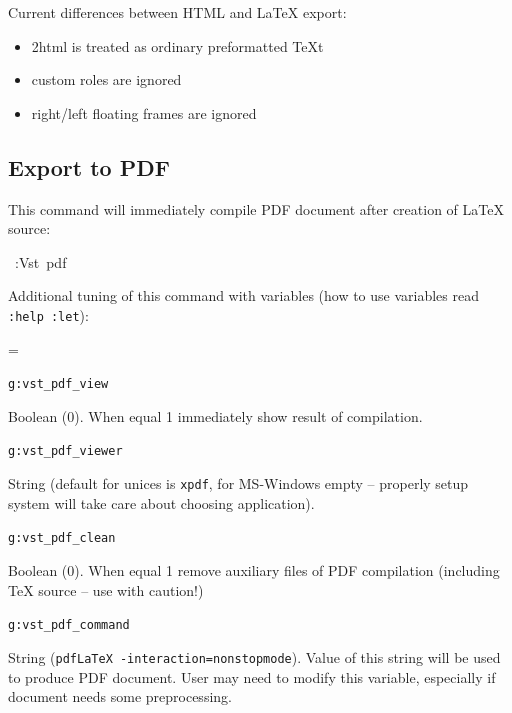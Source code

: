 \documentclass[12pt]{article}
\newenvironment{deflist}[1]{%
\begin{list}{}
{\renewcommand{\makelabel}[1]{\textbf{##1}\hfill}
\settowidth{\labelwidth}{\textbf{#1}}
\leftmargin=\labelwidth
\advance \leftmargin\labelsep}}
{\end{list}}
\begin{document}
Current differences between HTML and \LaTeX{} export:

\begin{itemize}
\item
2html is treated as ordinary preformatted \TeX{}t

\item
custom roles are ignored

\item
right/left floating frames are ignored
\end{itemize}
\hypertarget{lexport-to-pdf}{}
\subsection{Export to PDF}

This command will immediately compile PDF document after creation of
\LaTeX{} source:

\begin{ttfamily}\begin{flushleft}
\mbox{~:Vst~pdf}\\
\end{flushleft}\end{ttfamily}

Additional tuning of this command with variables (how to use variables read
\texttt{:help :let}):

\begin{deflist}{iii}

\item[\texttt{g:vst\_pdf\_view}]

Boolean (0). When equal 1 immediately show result of compilation.

\item[\texttt{g:vst\_pdf\_viewer}]

String (default for unices is \texttt{xpdf}, for MS-Windows empty
-- properly setup system will take care about choosing application).

\item[\texttt{g:vst\_pdf\_clean}]

Boolean (0). When equal 1 remove auxiliary files of PDF compilation
(including \TeX{} source -- use with caution!)

\item[\texttt{g:vst\_pdf\_command}]

String (\texttt{pdf\LaTeX{} -interaction=nonstopmode}). Value of this string will
be used to produce PDF document. User may need to modify this variable,
especially if document needs some preprocessing.
\end{deflist}
\hypertarget{lexport-to-xml}{}
\end{document}
